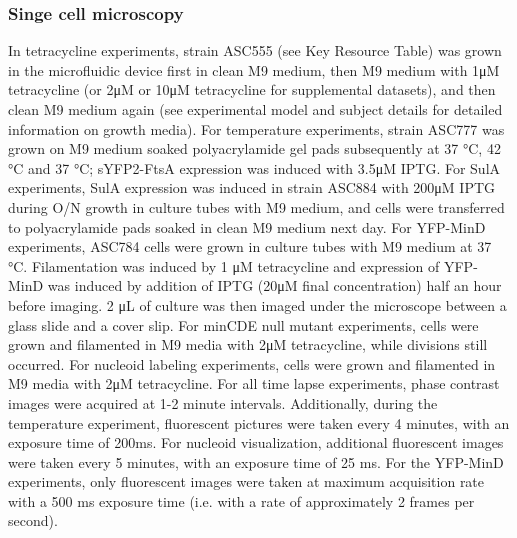 \subsubsection{Singe cell microscopy}
In tetracycline experiments, strain ASC555 (see Key Resource Table) was grown in the microfluidic device first in clean M9 medium, then M9 medium with 1μM tetracycline (or 2μM or 10μM tetracycline for supplemental datasets), and then clean M9 medium again (see experimental model and subject details for detailed information on growth media). For temperature experiments, strain ASC777 was grown on M9 medium soaked polyacrylamide gel pads subsequently at 37 °C, 42 °C and 37 °C; sYFP2-FtsA expression was induced with 3.5μM IPTG. For SulA experiments, SulA expression was induced in strain ASC884 with 200μM IPTG during O/N growth in culture tubes with M9 medium, and cells were transferred to polyacrylamide pads soaked in clean M9 medium next day. For YFP-MinD experiments, ASC784 cells were grown in culture tubes with M9 medium at 37 °C. Filamentation was induced by 1 μM tetracycline and expression of YFP-MinD was induced by addition of IPTG (20μM final concentration) half an hour before imaging. 2 μL of culture was then imaged under the microscope between a glass slide and a cover slip. For minCDE null mutant experiments, cells were grown and filamented in M9 media with 2μM tetracycline, while divisions still occurred. For nucleoid labeling experiments, cells were grown and filamented in M9 media with 2μM tetracycline. For all time lapse experiments, phase contrast images were acquired at 1-2 minute intervals. Additionally, during the temperature experiment, fluorescent pictures were taken every 4 minutes, with an exposure time of 200ms. For nucleoid visualization, additional fluorescent images were taken every 5 minutes, with an exposure time of 25 ms. For the YFP-MinD experiments, only fluorescent images were taken at maximum acquisition rate with a 500 ms exposure time (i.e. with a rate of approximately 2 frames per second).

